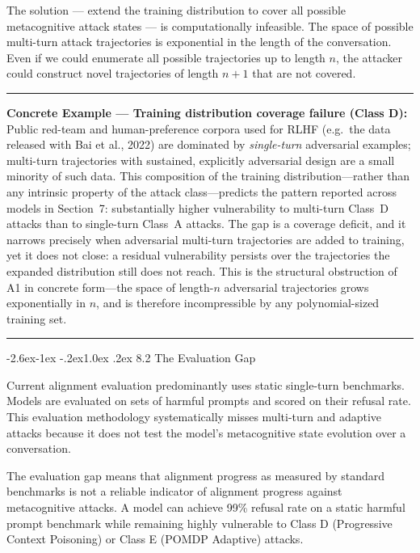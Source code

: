 \documentclass[
  11pt,
]{article}
\makeatletter
\renewcommand\subsection{\@startsection{subsection}{2}{\z@}%
  {-2.6ex\@plus -1ex \@minus -.2ex}{1.0ex \@plus .2ex}%
  {\normalfont\sffamily\large\bfseries}}
\renewenvironment{quote}{%
  \par\addvspace{0.7em}%
  \noindent\rule{\linewidth}{1.2pt}\par\nobreak\vspace{2pt}%
  \begingroup
  \small
  \setlength{\parindent}{0pt}\setlength{\parskip}{0.3em}%
  \setlength{\leftskip}{0.9em}\setlength{\rightskip}{0.4em}%
  \ignorespaces
}{%
  \par\endgroup\vspace{2pt}%
  \noindent\rule{\linewidth}{0.4pt}\par\addvspace{0.7em}%
}
\makeatother
\begin{document}
The solution --- extend the training distribution to cover all possible
metacognitive attack states --- is computationally infeasible. The space
of possible multi-turn attack trajectories is exponential in the length
of the conversation. Even if we could enumerate all possible
trajectories up to length \(n\), the attacker could construct novel
trajectories of length \(n+1\) that are not covered.

\begin{quote}
\textbf{Concrete Example --- Training distribution coverage failure
(Class D):} Public red-team and human-preference corpora used for RLHF
(e.g.\ the data released with Bai et al., 2022) are dominated by
\emph{single-turn} adversarial examples; multi-turn trajectories with
sustained, explicitly adversarial design are a small minority of such
data. This composition of the training distribution---rather than any
intrinsic property of the attack class---predicts the pattern reported across models in Section~7: substantially higher vulnerability to
multi-turn Class~D attacks than to single-turn Class~A attacks. The
gap is a coverage deficit, and it narrows precisely when adversarial
multi-turn trajectories are added to training, yet it does not close: a
residual vulnerability persists over the trajectories the expanded
distribution still does not reach. This is the structural obstruction
of A1 in concrete form---the space of length-\(n\) adversarial
trajectories grows exponentially in \(n\), and is therefore
incompressible by any polynomial-sized training set.
\end{quote}

\subsection{8.2 The Evaluation Gap}\label{the-evaluation-gap}

Current alignment evaluation predominantly uses static single-turn
benchmarks. Models are evaluated on sets of harmful prompts and scored
on their refusal rate. This evaluation methodology systematically misses
multi-turn and adaptive attacks because it does not test the model's
metacognitive state evolution over a conversation.

The evaluation gap means that alignment progress as measured by standard
benchmarks is not a reliable indicator of alignment progress against
metacognitive attacks. A model can achieve 99\% refusal rate on a static
harmful prompt benchmark while remaining highly vulnerable to Class D
(Progressive Context Poisoning) or Class E (POMDP Adaptive) attacks.
\end{document}
